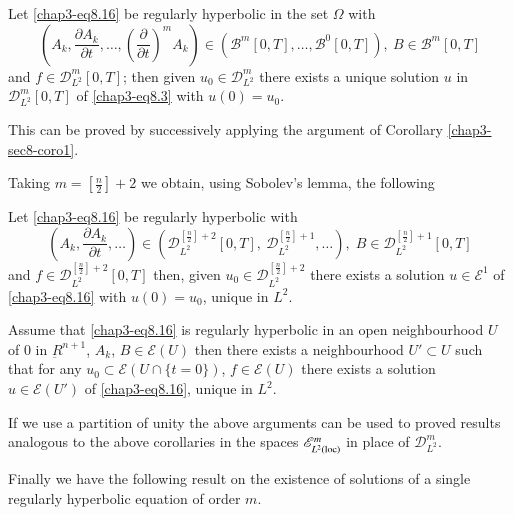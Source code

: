 \begin{corollary}\label{chap3-sec8-coro2} %
Let \eqref{chap3-eq8.16} be regularly hyperbolic in the set $\Omega$ with  
$$
\left( A_k, \frac{\partial A_k}{\partial t}, \ldots, \left(
\frac{\partial}{\partial t} \right)^m A_k \right) 
\in ( \mathscr{B}^{m}
\left[  0, T \right], \ldots, \mathscr{B}^{0} \left[  0, T \right] ),
~ B \in \mathscr{B}^{m} \left[0, T \right] 
$$
and $f \in \mathscr{D}^{m}_{L^2} \left[ 0, T \right]$; then
given $u_0 \in \mathscr{D}^{m}_{L^2} $ there exists a unique
solution $u$ in\pageoriginale $\mathscr{D}^{m}_{L^2} \left[ 0, T
  \right]$ of \eqref{chap3-eq8.3} with $u (0) = u_0$.  

 This can be proved by successively applying  the argument of
 Corollary \ref{chap3-sec8-coro1}.  

Taking $m = \left[\frac{n}{2}\right] + 2$ we obtain, using Sobolev's lemma, the
following  
\end{corollary}

\begin{corollary}\label{chap3-sec8-coro3} %
 Let \eqref{chap3-eq8.16} be regularly hyperbolic with 
 $$
 \left(A_k,  \frac{\partial A_k}{\partial t},\ldots\right) \in
 \left(\mathscr{D}^{[\frac{n}{2}] +2}_{L^2} \left[  0, T \right], ~
 \mathscr{D}^{[\frac{n}{2}] +1}_{L^2},\ldots\right), \;  B \in
 \mathscr{D}^{[\frac{n}{2}] +1}_{L^2} \left[  0, T \right] 
 $$
 and $f \in \mathscr{D}^{[\frac{n}{2}] +2}_{L^2} \left[  0, T
   \right]$ 
  then, given $u_0 \in  \mathscr{D}^{[\frac{n}{2}] + 2}_{L^2}
  $ there exists a solution $u \in\mathscr{E}^1$ of \eqref{chap3-eq8.16}
  with $u (0) = u_0$, unique in $L^2$. 
\end{corollary} 

\begin{corollary}\label{chap3-sec8-coro4} %
Assume that \eqref{chap3-eq8.16} is regularly hyperbolic in an open
neighbourhood $U$ 
of 0 in $\underbar{R}^{n+1}$, $A_k$, $B \in \mathscr{E} (U)$
then there  exists a neighbourhood $U' \subset U$ such that for any
$u_0 \subset \mathscr{E} (  U \cap \{ t = 0 \} )$, $f \in
\mathscr{E} (U)$ there exists a solution $u \in \mathscr{E}
(U')$ of \eqref{chap3-eq8.16}, unique in $L^2$. 
\end{corollary}

\begin{remark*}%
If we use a partition of unity the above arguments can be used to
proved results analogous to the above corollaries in the spaces
$\mathscr{E}^m_{L^2 (\operatorname{loc})}$ in place of $\mathscr{D}^m_{L^2}$. 

Finally we have the following result on the existence of solutions of
a single regularly hyperbolic equation of order $m$. 
\end{remark*}

